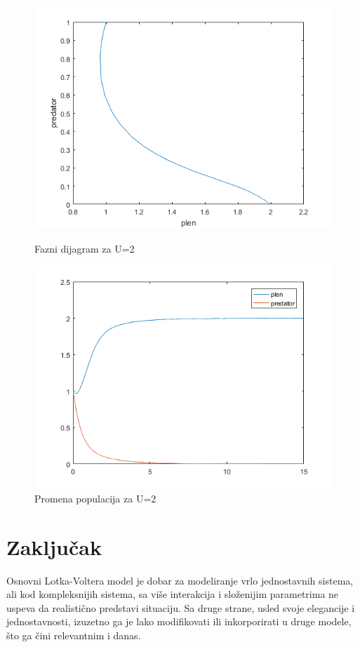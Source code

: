 \documentclass[a4paper]{article}
\begin{document}
\begin{figure}[H]
    \centering
    \begin{minipage}{0.45\textwidth}
        \centering
        \includegraphics[width=1\textwidth]{images/lv_low_u_phase} %
        \caption{Fazni dijagram za U=2}
    \end{minipage}\hfill
    \begin{minipage}{0.45\textwidth}
        \centering
        \includegraphics[width=1\textwidth]{images/lv_low_u_time} %
        \caption{Promena populacija za U=2}
    \end{minipage}
\end{figure}

\section{Zaključak}
\label{sec:zakljucak}

Osnovni Lotka-Voltera model je dobar za modeliranje vrlo jednostavnih sistema,
ali kod kompleksnijih sistema, sa više interakcija i složenijim parametrima ne uspeva
da realistično predstavi situaciju. Sa druge strane, usled svoje elegancije i jednostavnosti,
izuzetno ga je lako modifikovati ili inkorporirati u druge modele, što ga čini relevantnim i danas.
\end{document}
